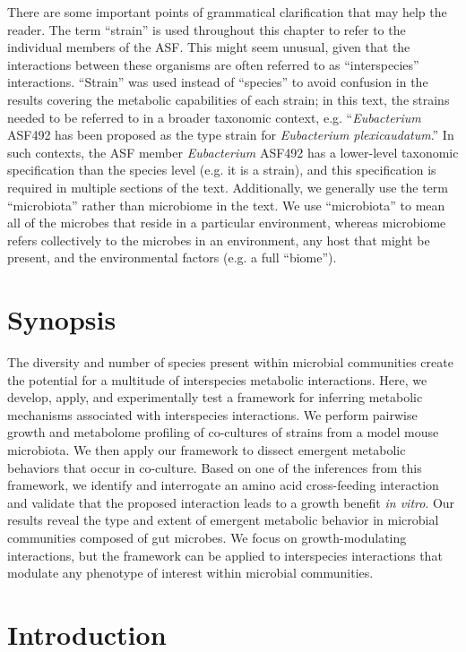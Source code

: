 \documentclass[11pt,onecolumn,notitlepage,openany,twoside]{book}
\begin{document}
\begin{refsection}
There are some important points of grammatical clarification that may help the reader. The term ``strain'' is used throughout this chapter to refer to the individual members of the ASF. This might seem unusual, given that the interactions between these organisms are often referred to as ``interspecies'' interactions. ``Strain'' was used instead of ``species'' to avoid confusion in the results covering the metabolic capabilities of each strain; in this text, the strains needed to be referred to in a broader taxonomic context, e.g. ``\textit{Eubacterium} ASF492 has been proposed as the type strain for \textit{Eubacterium plexicaudatum}.'' In such contexts, the ASF member \textit{Eubacterium} ASF492 has a lower-level taxonomic specification than the species level (e.g. it is a strain), and this specification is required in multiple sections of the text. Additionally, we generally use the term ``microbiota'' rather than microbiome in the text. We use ``microbiota'' to mean all of the microbes that reside in a particular environment, whereas microbiome refers collectively to the microbes in an environment, any host that might be present, and the environmental factors (e.g. a full ``biome'').

\section{Synopsis}

The diversity and number of species present within microbial communities create the potential for a multitude of interspecies metabolic interactions. Here, we develop, apply, and experimentally test a framework for inferring metabolic mechanisms associated with interspecies interactions. We perform pairwise growth and metabolome profiling of co-cultures of strains from a model mouse microbiota. We then apply our framework to dissect emergent metabolic behaviors that occur in co-culture. Based on one of the inferences from this framework, we identify and interrogate an amino acid cross-feeding interaction and validate that the proposed interaction leads to a growth benefit \textit{in vitro}. Our results reveal the type and extent of emergent metabolic behavior in microbial communities composed of gut microbes. We focus on growth-modulating interactions, but the framework can be applied to interspecies interactions that modulate any phenotype of interest within microbial communities.

\section{Introduction}


\end{refsection}
\end{document}
